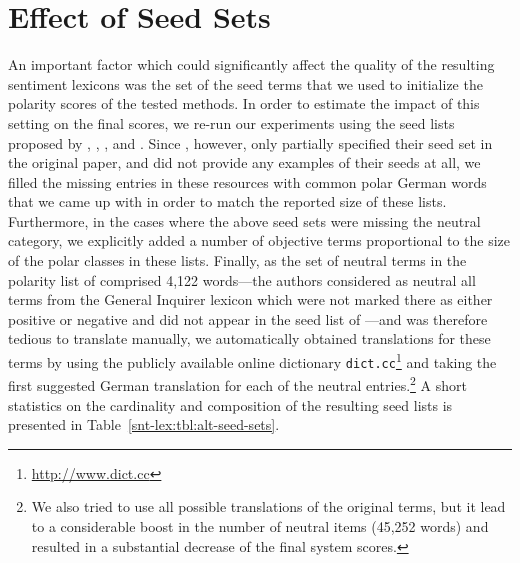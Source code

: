 
\section{Effect of Seed Sets}\label{subsec:snt-lex:eoss}

An important factor which could significantly affect the quality of
the resulting sentiment lexicons was the set of the seed terms that we
used to initialize the polarity scores of the tested methods.  In
order to estimate the impact of this setting on the final scores, we
re-run our experiments using the seed lists proposed by \citet{Hu:04},
\citet{Kim:04}, \citet{Esuli:06c}, and \citet{Remus:10}.  Since
\citet{Hu:04}, however, only partially specified their seed set in the
original paper, and \citet{Kim:04} did not provide any examples of
their seeds at all, we filled the missing entries in these resources
with common polar German words that we came up with in order to match
the reported size of these lists.  Furthermore, in the cases where the
above seed sets were missing the neutral category, we explicitly added
a number of objective terms proportional to the size of the polar
classes in these lists.  Finally, as the set of neutral terms in the
polarity list of \citet{Esuli:06c} comprised 4,122 words---the authors
considered as neutral all terms from the General Inquirer lexicon
\cite{Stone:66} which were not marked there as either positive or
negative and did not appear in the seed list of
\citet{Turney:03}---and was therefore tedious to translate manually,
we automatically obtained translations for these terms by using the
publicly available online dictionary
\texttt{dict.cc}\footnote{\url{http://www.dict.cc}} and taking the
first suggested German translation for each of the neutral
entries.\footnote{We also tried to use all possible translations of
  the original terms, but it lead to a considerable boost in the
  number of neutral items (45,252 words) and resulted in a substantial
  decrease of the final system scores.} A short statistics on the
cardinality and composition of the resulting seed lists is presented
in Table~\ref{snt-lex:tbl:alt-seed-sets}.

